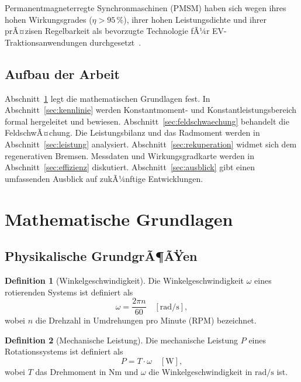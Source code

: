 ﻿\documentclass[a4paper,12pt]{article}
\theoremstyle{definition}
\newtheorem{definition}{Definition}
\begin{document}
Permanentmagneterregte Synchronmaschinen (PMSM) haben sich wegen ihres hohen
Wirkungsgrades ($\eta > 95\,\%$), ihrer hohen Leistungsdichte und ihrer prÃ¤zisen
Regelbarkeit als bevorzugte Technologie fÃ¼r EV-Traktionsanwendungen
durchgesetzt~\cite{bose2002modern,zhu2007electrical}.

\subsection{Aufbau der Arbeit}

Abschnitt~\ref{sec:grundlagen} legt die mathematischen Grundlagen fest. In
Abschnitt~\ref{sec:kennlinie} werden Konstantmoment- und Konstantleistungsbereich
formal hergeleitet und bewiesen. Abschnitt~\ref{sec:feldschwaechung} behandelt
die FeldschwÃ¤chung. Die Leistungsbilanz und das Radmoment werden in
Abschnitt~\ref{sec:leistung} analysiert. Abschnitt~\ref{sec:rekuperation}
widmet sich dem regenerativen Bremsen. Messdaten und Wirkungsgradkarte werden in
Abschnitt~\ref{sec:effizienz} diskutiert. Abschnitt~\ref{sec:ausblick} gibt
einen umfassenden Ausblick auf zukÃ¼nftige Entwicklungen.

\section{Mathematische Grundlagen}
\label{sec:grundlagen}

\subsection{Physikalische GrundgrÃ¶ÃŸen}

\begin{definition}[Winkelgeschwindigkeit]
    Die Winkelgeschwindigkeit $\omega$ eines rotierenden Systems ist definiert als
    \[
        \omega = \frac{2\pi n}{60} \quad \left[\si{\radian\per\second}\right],
    \]
    wobei $n$ die Drehzahl in Umdrehungen pro Minute (RPM) bezeichnet.
\end{definition}

\begin{definition}[Mechanische Leistung]
    Die mechanische Leistung $P$ eines Rotationssystems ist definiert als
    \[
        P = T \cdot \omega \quad [\si{\watt}],
    \]
    wobei $T$ das Drehmoment in $\si{\newton\metre}$ und $\omega$ die
    Winkelgeschwindigkeit in $\si{\radian\per\second}$ ist.
\end{definition}
\end{document}
